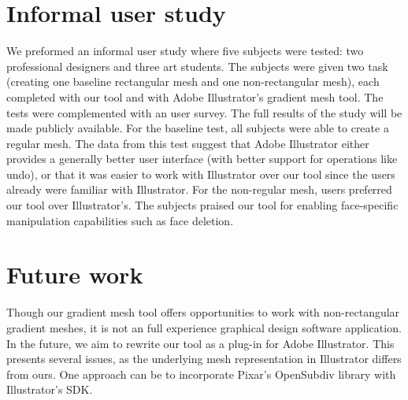 \documentclass{egpubl}
\newcommand{\note}[3]{{\color{#2}\textbf{#1: #3}}}
\newcommand{\john}[1]{\note{JohnKa}{RubineRed}{#1}}
\begin{document}
	\section{Informal user study}
	\label{sec:results}
	
	
	
	We preformed an informal user study where five subjects were tested: two professional designers and three art students. The subjects were given two task (creating one baseline rectangular mesh and one non-rectangular mesh), each completed with our tool and with Adobe Illustrator's gradient mesh tool. The tests were complemented with an user survey. The full results of the study will be made publicly available. For the baseline test, all subjects were able to create a regular mesh. The data from this test suggest that Adobe Illustrator either provides a generally better user interface (with better support for operations like undo), or that it was easier to work with Illustrator over our tool since the users already were familiar with Illustrator. For the non-regular mesh, users preferred our tool over Illustrator's. The subjects praised our tool for enabling face-specific manipulation capabilities such as face deletion.
	
	\section{Future work}
	\label{sec:FW}
	
	Though our gradient mesh tool offers opportunities to work with non-rectangular gradient meshes, it is not an full experience graphical design software application. In the future, we aim to rewrite our tool as a plug-in for Adobe Illustrator. This presents several issues, as the underlying mesh representation in Illustrator differs from ours. One approach can be to incorporate Pixar's OpenSubdiv library with Illustrator's SDK.
	
	
	
	
	
\end{document}

